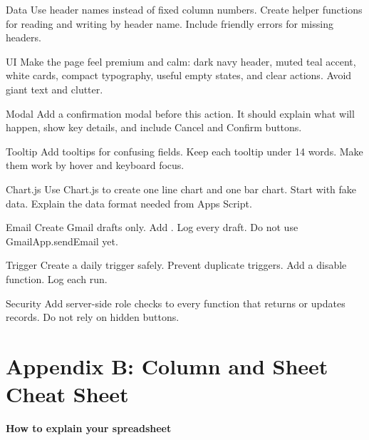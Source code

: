 \documentclass[10pt]{article}
\newcommand{\code}[1]{\texttt{\detokenize{#1}}}
\newcommand{\sectionkicker}[1]{\vspace{0.2em}{\small\bfseries\color{GCTeal}#1}\vspace{-0.15em}}
\newcommand{\tighttitle}[1]{{\Large\bfseries\color{GCNavy}#1}\par}
\begin{document}
\begin{textbox}{Data}
Use header names instead of fixed column numbers. Create helper functions for reading and writing by header name. Include friendly errors for missing headers.
\end{textbox}

\begin{textbox}{UI}
Make the page feel premium and calm: dark navy header, muted teal accent, white cards, compact typography, useful empty states, and clear actions. Avoid giant text and clutter.
\end{textbox}

\begin{textbox}{Modal}
Add a confirmation modal before this action. It should explain what will happen, show key details, and include Cancel and Confirm buttons.
\end{textbox}

\begin{textbox}{Tooltip}
Add tooltips for confusing fields. Keep each tooltip under 14 words. Make them work by hover and keyboard focus.
\end{textbox}

\begin{textbox}{Chart.js}
Use Chart.js to create one line chart and one bar chart. Start with fake data. Explain the data format needed from Apps Script.
\end{textbox}

\begin{textbox}{Email}
Create Gmail drafts only. Add \code{TEST_MODE}. Log every draft. Do not use GmailApp.sendEmail yet.
\end{textbox}

\begin{textbox}{Trigger}
Create a daily trigger safely. Prevent duplicate triggers. Add a disable function. Log each run.
\end{textbox}

\begin{textbox}{Security}
Add server-side role checks to every function that returns or updates records. Do not rely on hidden buttons.
\end{textbox}

\section{Appendix B: Column and Sheet Cheat Sheet}
\sectionkicker{STRUCTURE AI CAN USE}
\tighttitle{How to explain your spreadsheet}
\end{document}
